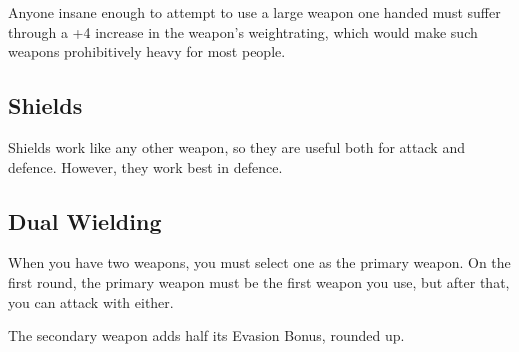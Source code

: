 \begin{multicols}{2}
Anyone insane enough to attempt to use a large weapon one handed must suffer through a +4 increase in the weapon's \gls{weightrating}, which would make such weapons prohibitively heavy for most people.

\subsection{Shields}

Shields work like any other weapon, so they are useful both for attack and defence.
However, they work best in defence.

\subsection{Dual Wielding}
\label{dualWielding}

When you have two weapons, you must select one as the primary weapon.
On the first round, the primary weapon must be the first weapon you use, but after that, you can attack with either.

The secondary weapon adds half its Evasion Bonus, rounded up.

\end{multicols}

\newcommand{\armourchart}{

  \begin{boxtable}[ccccX]

  \textbf{Armour} & \textbf{\glsentrytext{dr}} & \textbf{Weight} & \textbf{Noise} & \textbf{Price} \\\hline

  \textbf{Partial} \\\hline

  Elvish & 2 & -2 & 0 & 3gp \\

  Padded & 2 & 0 & 0 & 1sp \\

  Leather & 3 & 0 & 0 & 5sp \\

  Chain & 4 &  1 & 1 & 10sp \\

  Plate & 5 &  2 & 4 & 12gp \\
  \hline

  \textbf{Complete} \\\hline

  Elvish & 2 & -1  & 0 & 9gp \\

  Padded & 2 & 1  & 0 & 3sp \\

  Leather & 3 & 1  & 1 & 15sp \\

  Chain & 4 &  2  & 2 & 30sp \\

  Plate & 5 &  3  & 5 & 36gp \\

  \end{boxtable}
}

